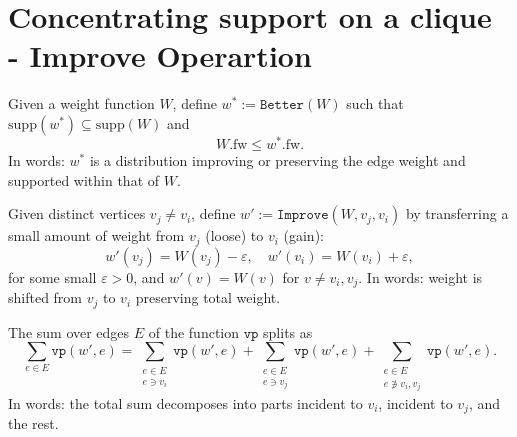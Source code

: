 


\section{Concentrating support on a clique - Improve Operartion}

\begin{definition}
    \label{def:Better}
Given a weight function \(W\), define \(w^* := \texttt{Better}(W)\) such that \(\mathrm{supp}(w^*) \subseteq \mathrm{supp}(W)\) and 
\[
W.\mathrm{fw} \leq w^*.\mathrm{fw}.
\]
In words: \(w^*\) is a distribution improving or preserving the edge weight and supported within that of \(W\).
\end{definition}

\begin{definition}
    \label{def:Improve}
Given distinct vertices \(v_j \neq v_i\), define \(w' := \texttt{Improve}(W, v_j, v_i)\) by transferring a small amount of weight from \(v_j\) (loose) to \(v_i\) (gain):
\[
w'(v_j) = W(v_j) - \varepsilon, \quad w'(v_i) = W(v_i) + \varepsilon,
\]
for some small \(\varepsilon > 0\), and \(w'(v) = W(v)\) for \(v \neq v_i, v_j\).
In words: weight is shifted from \(v_j\) to \(v_i\) preserving total weight.
\end{definition}

\begin{lemma}
    \label{lem:Improve_partition_sum_split}
The sum over edges \(E\) of the function \(\texttt{vp}\) splits as
\[
\sum_{e \in E} \texttt{vp}(w', e) = \sum_{\substack{e \in E \\ e \ni v_i}} \texttt{vp}(w', e) + \sum_{\substack{e \in E \\ e \ni v_j}} \texttt{vp}(w', e) + \sum_{\substack{e \in E \\ e \not\ni v_i, v_j}} \texttt{vp}(w', e).
\]
In words: the total sum decomposes into parts incident to \(v_i\), incident to \(v_j\), and the rest.
\end{lemma}

